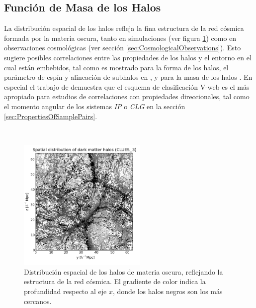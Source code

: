	\subsection{Función de Masa de los Halos}
	\label{subsec:Halos_Properties}


La distribución espacial de los halos refleja la fina estructura de la red 
cósmica formada por la materia oscura, tanto en simulaciones (ver figura 
\ref{fig:Halos_Web}) como en observaciones cosmológicas (ver sección 
\ref{sec:CosmologicalObservations}). Esto sugiere posibles correlaciones 
entre las propiedades de los halos y el entorno en el cual están embebidos, 
tal como es mostrado para la forma de los halos, el parámetro de espín y 
alineación de subhalos en \cite{libeskind2013}, y para la masa de los halos 
\cite{lemson1999}. En especial el trabajo de \cite{libeskind2013} demuestra 
que el esquema de clasificación V-web es el más apropiado para estudios de 
correlaciones con propiedades direccionales, tal como el momento angular de 
los sistemas \textit{IP} o \textit{CLG} en la sección
\ref{sec:PropertiesOfSamplePairs}.

\
\begin{figure}[htbp]
	\centering
	\includegraphics[width=0.55\textwidth]
	{./figures/3_nbody_simulations/Halos_Spatial_Distribution(CLUES_16953).png}

	\caption{\small{Distribución espacial de los halos de materia oscura, 
	reflejando la estructura de la red cósmica. El gradiente de color 
	indica la profundidad respecto al eje $x$, donde los halos negros son 
	los más cercanos.}}
	
	\label{fig:Halos_Web}
\end{figure}



